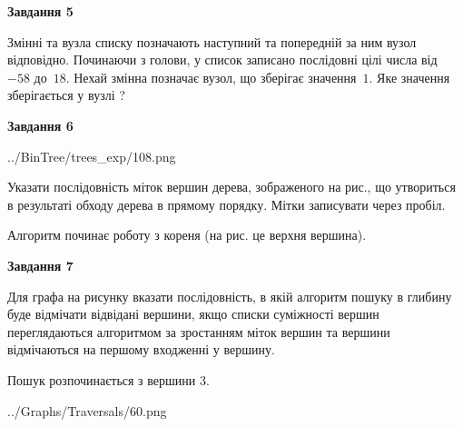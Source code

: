 \documentclass[12pt, ukrainian]{article}
\begin{document}
{\begin {large}
{\begin {center}\textbf{Завдання 5}\end {center}}\par
Змінні  та  вузла списку позначають наступний та попередній за ним вузол відповідно. Починаючи з голови, у список записано послідовні цілі числа від~$-58$ до~$18$. Нехай змінна  позначає вузол, що зберігає значення~$1$.
Яке значення зберігається у вузлі  ?\par
\newpage

{\begin {center}\textbf{Завдання 6}\end {center}}\par

\begin{center}
	{../BinTree/trees_exp/108.png}
\end{center}
Указати послідовність міток вершин дерева, зображеного на рис., що утвориться в результаті обходу дерева в прямому порядку. Мітки записувати через пробіл.\par Алгоритм починає роботу з кореня (на рис. це верхня вершина).\par
\newpage

{\begin {center}\textbf{Завдання 7}\end {center}}\par
Для графа на рисунку вказати послідовність, в якій алгоритм пошуку в глибину буде відмічати відвідані вершини, якщо списки суміжності вершин переглядаються алгоритмом за зростанням міток вершин та вершини відмічаються на першому вход\-женні у вершину.\par
Пошук розпочинається з вершини 3.\par

\begin{center}
	{../Graphs/Traversals/60.png}
\end{center}\par
\newpage


\end{large}}
\end{document}
